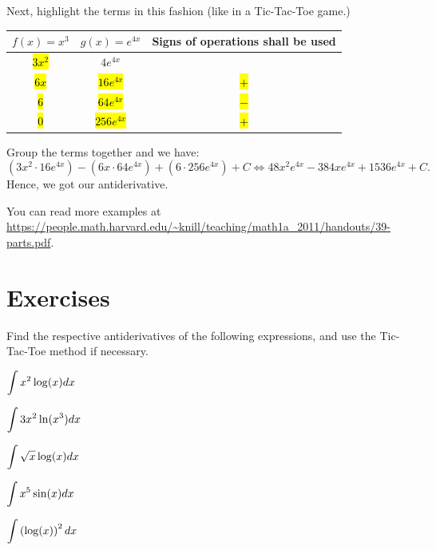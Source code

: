 \documentclass[11pt,paper=letter]{scrartcl}
\newcommand{\hlc}[2][yellow]{ {\sethlcolor{#1} \hl{#2}} }
\begin{document}
\vspace{2mm}

Next, highlight the terms in this fashion (like in a Tic-Tac-Toe game.)

\begin{center}
    \begin{tabular}{c|c|c}
       $f(x) = x^{3}$ & $g(x) = e^{4x}$ & \textbf{Signs of operations shall be used}\\
            \hline
        \hlc[green]{$3x^2$} & $4e^{4x}$ & \\
            \hline
        \hlc[Apricot]{$6x$} &  \hlc[green]{$16e^{4x}$} &  \hlc[green]{$+$} \\    
            \hline
        \hlc[Purple]{$6$} &  \hlc[Apricot]{$64e^{4x}$} & \hlc[Apricot]{$-$} \\   
            \hline
        \hlc[YellowGreen]{$0$} & \hlc[Purple]{$256e^{4x}$} & \hlc[Purple]{$+$} \\   
        
    \end{tabular}
\end{center}

Group the terms together and we have: $$\left(3x^2 \cdot 16e^{4x}\right) - \left(6x \cdot 64e^{4x}\right) + \left(6\cdot 256e^{4x}\right) + C \Longleftrightarrow 48x^2e^{4x} - 384xe^{4x} + 1536e^{4x} + C.$$ Hence, we got our antiderivative.

\vspace{2mm}

You can read more examples at \url{https://people.math.harvard.edu/~knill/teaching/math1a_2011/handouts/39-parts.pdf}.

\section{Exercises}

Find the respective antiderivatives of the following expressions, and use the Tic-Tac-Toe method if necessary.

\begin{mdframed}[style=exmdbox]
\begin{exercise}
$\mathlarger{\int x^2 \log(x) dx}$
\end{exercise}

\begin{exercise}
$\mathlarger{\int 3x^2 \ln(x^3) dx}$
\end{exercise}

\begin{exercise}
$\mathlarger{\int \sqrt{x} \log(x) dx}$
\end{exercise}

\begin{exercise}
$\mathlarger{\int x^5 \sin(x) dx}$
\end{exercise}

\begin{exercise}
$\mathlarger{\int \left(\log(x) \right)^2 dx}$
\end{exercise}
\end{mdframed}
\end{document}
